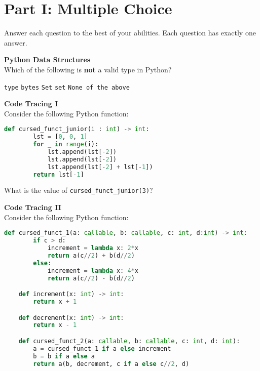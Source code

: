 \documentclass[letterpaper,12pt,addpoints]{exam}
\begin{document}
    \section*{Part I: Multiple Choice}
    Answer each question to the best of your abilities. Each question has exactly one answer.
    \begin{questions}


    \question[2] \textbf{Python Data Structures} \\
    Which of the following is \textbf{not} a valid type in Python?
        \begin{choices}
            \choice \texttt{type}
            \choice \texttt{bytes}
            \choice \texttt{Set}
            \choice \texttt{set}
            \choice \texttt{None of the above}
        \end{choices}

    \question[2] \textbf{Code Tracing I} \\
    Consider the following Python function: 
    \begin{lstlisting}[language=Python, style=mystyle]
    def cursed_funct_junior(i : int) -> int:
        lst = [0, 0, 1]
        for _ in range(i):
            lst.append(lst[-2])
            lst.append(lst[-2])
            lst.append(lst[-2] + lst[-1])
        return lst[-1]
    \end{lstlisting}
    What is the value of \texttt{cursed\_funct\_junior(3)}?
    \begin{choices}
    \end{choices}

    \question[2] \textbf{Code Tracing II} \\
    Consider the following Python function:
    \begin{lstlisting}[language=Python, style=mystyle]
    def cursed_funct_1(a: callable, b: callable, c: int, d:int) -> int:
        if c > d:
            increment = lambda x: 2*x
            return a(c//2) + b(d//2)
        else:
            increment = lambda x: 4*x
            return a(c//2) - b(d//2)

    def increment(x: int) -> int:
        return x + 1

    def decrement(x: int) -> int:
        return x - 1

    def cursed_funct_2(a: callable, b: callable, c: int, d: int):
        a = cursed_funct_1 if a else increment
        b = b if a else a
        return a(b, decrement, c if a else c//2, d)



\end{lstlisting}
\end{questions}
\end{document}
